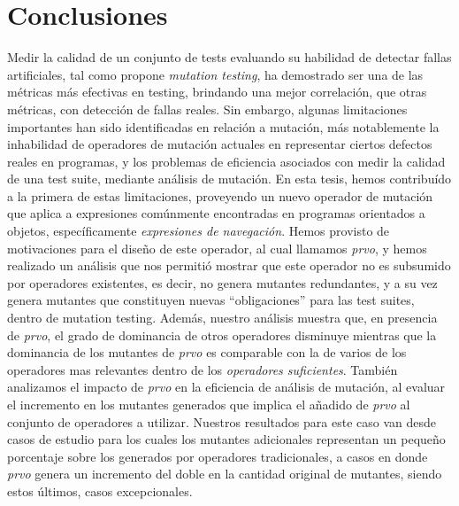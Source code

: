 \chapter[Conclusiones]{Conclusiones}
\label{cap:conclutions}

Medir la calidad de un conjunto de tests evaluando su habilidad de detectar fallas artificiales, tal como propone \emph{mutation testing}, ha demostrado ser una de las m\'etricas m\'as efectivas en testing, brindando una mejor correlaci\'on, que otras m\'etricas, con detecci\'on de fallas reales. Sin embargo, algunas limitaciones importantes han sido identificadas en relaci\'on a mutaci\'on, m\'as notablemente la inhabilidad de operadores de mutaci\'on actuales en representar ciertos defectos reales en programas, y los problemas de eficiencia asociados con medir la calidad de una test suite, mediante an\'alisis de mutaci\'on. En esta tesis, hemos contribu\'ido a la primera de estas limitaciones, proveyendo un nuevo operador de mutaci\'on que aplica a expresiones com\'unmente encontradas en programas orientados a objetos, espec\'ificamente \emph{expresiones de navegaci\'on}. Hemos provisto de motivaciones para el dise\~no de este operador, al cual llamamos \emph{prvo}, y hemos realizado un an\'alisis que nos permiti\'o mostrar que este operador no es subsumido por operadores existentes, es decir, no genera mutantes redundantes, y a su vez genera mutantes que constituyen nuevas ``obligaciones'' para las test suites, dentro de mutation testing. Adem\'as, nuestro an\'alisis muestra que, en presencia de \emph{prvo}, el grado de dominancia de otros operadores disminuye mientras que la dominancia de los mutantes de \emph{prvo} es comparable con la de varios de los operadores mas relevantes dentro de los \emph{operadores suficientes}. Tambi\'en analizamos el impacto de \emph{prvo} en la eficiencia de an\'alisis de mutaci\'on, al evaluar el incremento en los mutantes generados que implica el a\~nadido de \emph{prvo} al conjunto de operadores a utilizar. Nuestros resultados para este caso van desde casos de estudio para los cuales los mutantes adicionales representan un peque\~no porcentaje sobre los generados por operadores tradicionales, a casos en donde \emph{prvo} genera un incremento del doble en la cantidad original de mutantes, siendo estos \'ultimos, casos excepcionales.

